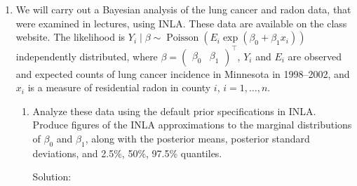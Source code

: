 \documentclass[letterpaper,11pt]{article}
\begin{document}
\begin{enumerate}
\begin{enumerate}
\begin{enumerate}
    \item 
    \item 
    \end{enumerate}
  \end{enumerate}
\item We will carry out a Bayesian analysis of the lung cancer and radon data,
  that were examined in lectures, using INLA. These data are available on the
  class website. The likelihood is
  $Y_i \mid \beta \sim \operatorname{Poisson}\left (E_i\exp\left(\beta_0 +
      \beta_1x_i\right)\right)$ independently distributed, where
  $\beta = \begin{pmatrix}\beta_0 & \beta_1\end{pmatrix}^\intercal$, $Y_i$ and
  $E_i$ are observed and expected counts of lung cancer incidence in Minnesota
  in 1998--2002, and $x_i$ is a measure of residential radon in county $i$,
  $i = 1,\ldots,n$.

  \begin{enumerate}
  \item Analyze these data using the default prior specifications in
    INLA. Produce figures of the INLA approximations to the marginal
    distributions of $\beta_0$ and $\beta_1$, along with the posterior means,
    posterior standard deviations, and 2.5\%, 50\%, 97.5\% quantiles.

    \begin{description}
    \item[Solution:] 
    \end{description}    
  \end{enumerate}
  
\end{enumerate}
\end{document}
